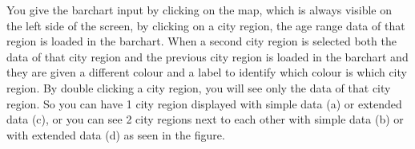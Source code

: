 \documentclass[a4paper,twoside,11pt]{article}
\begin{document}
\newline
\newline
\newline
You give the barchart input by clicking on the map, which is always visible on the left side of the screen, by clicking on a city region, the age range data of that region is loaded in the barchart. When a second city region is selected both the data of that city region and the previous city region is loaded in the barchart and they are given a different colour and a label to identify which colour is which city region. By double clicking a city region, you will see only the data of that city region. \newline
So you can have 1 city region displayed with simple data (a) or extended data (c), or you can see 2 city regions next to each other with simple data (b) or with extended data (d) as seen in the figure. \newline
\end{document}
